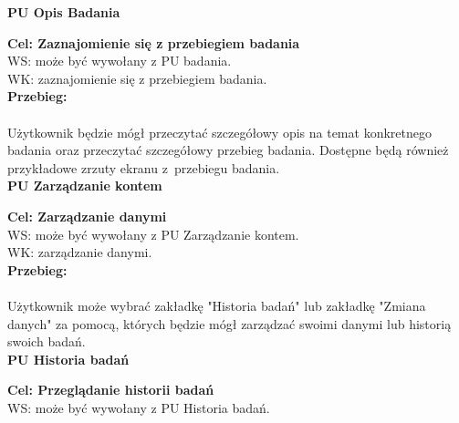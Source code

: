 \documentclass[12pt, letterpaper]{article}
\begin{document}
		\textbf{PU Opis Badania}
		
		\quad
		
		\textbf{Cel: Zaznajomienie się z przebiegiem badania}\\
		
		WS: może być wywołany z PU badania.\\
		
		WK: zaznajomienie się z przebiegiem badania.\\
		
		\textbf{Przebieg: }
\paragraph{}Użytkownik będzie mógł przeczytać szczegółowy opis na temat konkretnego badania oraz przeczytać szczegółowy przebieg badania. Dostępne będą również przykładowe zrzuty ekranu z~przebiegu badania.\\
		 
		
		\textbf{PU Zarządzanie kontem}
		
		\quad
		
		\textbf{Cel: Zarządzanie danymi}\\
		
		WS: może być wywołany z PU Zarządzanie kontem.\\
		
		WK: zarządzanie danymi.\\
		
		\textbf{Przebieg:}
\paragraph{}Użytkownik może wybrać zakładkę "Historia badań" lub zakładkę "Zmiana danych" za pomocą, których będzie mógł zarządzać swoimi danymi lub historią swoich badań.\\
		 
		
		\textbf{PU Historia badań}
		
		\quad
		
		\textbf{Cel: Przeglądanie historii badań}\\
		
		WS: może być wywołany z PU Historia badań.\\
		
\end{document}
